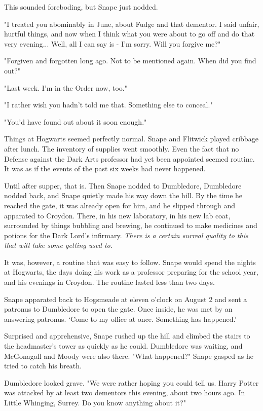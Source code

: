 \documentclass[a4paper,11pt]{article}
\begin{document}
This sounded foreboding, but Snape just nodded.

"I treated you abominably in June, about Fudge and that dementor. I said unfair, hurtful things, and now when I think what you were about to go off and do that very evening... Well, all I can say is - I'm sorry. Will you forgive me?"

"Forgiven and forgotten long ago. Not to be mentioned again. When did you find out?"

"Last week. I'm in the Order now, too."

"I rather wish you hadn't told me that. Something else to conceal."

"You'd have found out about it soon enough."

Things at Hogwarts seemed perfectly normal. Snape and Flitwick played cribbage after lunch. The inventory of supplies went smoothly. Even the fact that no Defense against the Dark Arts professor had yet been appointed seemed routine. It was as if the events of the past six weeks had never happened.

Until after supper, that is. Then Snape nodded to Dumbledore, Dumbledore nodded back, and Snape quietly made his way down the hill. By the time he reached the gate, it was already open for him, and he slipped through and apparated to Croydon. There, in his new laboratory, in his new lab coat, surrounded by things bubbling and brewing, he continued to make medicines and potions for the Dark Lord's infirmary. \emph{There is a certain surreal quality to this that will take some getting used to.}

It was, however, a routine that was easy to follow. Snape would spend the nights at Hogwarts, the days doing his work as a professor preparing for the school year, and his evenings in Croydon. The routine lasted less than two days.

Snape apparated back to Hogsmeade at eleven o'clock on August 2 and sent a patronus to Dumbledore to open the gate. Once inside, he was met by an answering patronus. `Come to my office at once. Something has happened.'

Surprised and apprehensive, Snape rushed up the hill and climbed the stairs to the headmaster's tower as quickly as he could. Dumbledore was waiting, and McGonagall and Moody were also there. "What happened?" Snape gasped as he tried to catch his breath.

Dumbledore looked grave. "We were rather hoping you could tell us. Harry Potter was attacked by at least two dementors this evening, about two hours ago. In Little Whinging, Surrey. Do you know anything about it?"
\end{document}
